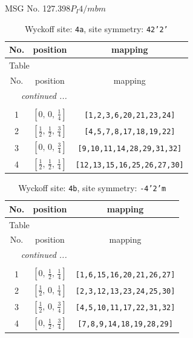 \documentclass[fleqn,8pt]{jsarticle}
\begin{document}
\setcounter{MaxMatrixCols}{32}

\renewcommand{\tablename}{Table~}
\renewcommand{\figurename}{Figure~}
\begin{center}
\LARGE
MSG No. 127.398\quad$P_{I}4/mbm$
\end{center}
\renewcommand{\arraystretch}{1.2}
\begin{longtable}{ccc}
\caption{Wyckoff site: {\tt 4a}, site symmetry: {\tt 42'2'}}
 \\
 \hline \hline
No. & position & mapping \\ \hline \endfirsthead

\multicolumn{2}{l}{\tablename\ \thetable{}} \\
 \hline \hline
No. & position & mapping \\ \hline \endhead

 \hline \hline
\multicolumn{2}{r}{\footnotesize\it continued ...} \\ \endfoot

 \hline \hline
\multicolumn{2}{r}{} \\ \endlastfoot

1 & $\left[ 0,\, 0,\, \frac{1}{4} \right]$ & {\tt [1,2,3,6,20,21,23,24]} \\ \hline
2 & $\left[ \frac{1}{2},\, \frac{1}{2},\, \frac{3}{4} \right]$ & {\tt [4,5,7,8,17,18,19,22]} \\ \hline
3 & $\left[ 0,\, 0,\, \frac{3}{4} \right]$ & {\tt [9,10,11,14,28,29,31,32]} \\ \hline
4 & $\left[ \frac{1}{2},\, \frac{1}{2},\, \frac{1}{4} \right]$ & {\tt [12,13,15,16,25,26,27,30]} \\
\end{longtable}
\renewcommand{\arraystretch}{1.2}
\begin{longtable}{ccc}
\caption{Wyckoff site: {\tt 4b}, site symmetry: {\tt -4'2'm}}
 \\
 \hline \hline
No. & position & mapping \\ \hline \endfirsthead

\multicolumn{2}{l}{\tablename\ \thetable{}} \\
 \hline \hline
No. & position & mapping \\ \hline \endhead

 \hline \hline
\multicolumn{2}{r}{\footnotesize\it continued ...} \\ \endfoot

 \hline \hline
\multicolumn{2}{r}{} \\ \endlastfoot

1 & $\left[ 0,\, \frac{1}{2},\, \frac{1}{4} \right]$ & {\tt [1,6,15,16,20,21,26,27]} \\ \hline
2 & $\left[ \frac{1}{2},\, 0,\, \frac{1}{4} \right]$ & {\tt [2,3,12,13,23,24,25,30]} \\ \hline
3 & $\left[ \frac{1}{2},\, 0,\, \frac{3}{4} \right]$ & {\tt [4,5,10,11,17,22,31,32]} \\ \hline
4 & $\left[ 0,\, \frac{1}{2},\, \frac{3}{4} \right]$ & {\tt [7,8,9,14,18,19,28,29]} \\
\end{longtable}
\end{document}
